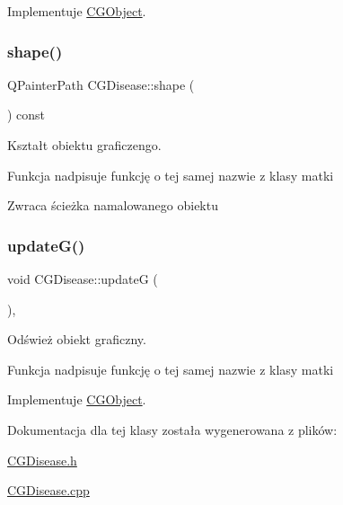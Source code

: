 Implementuje \mbox{\hyperlink{class_c_g_object_a9622c313eb09ca5fc0e34f5d2aaac910}{C\+G\+Object}}.

\mbox{\label{class_c_g_disease_a9cba2dd518ac5625a3982f6f92b3fd3f}} 
\subsubsection{\texorpdfstring{shape()}{shape()}}
{\footnotesize\ttfamily Q\+Painter\+Path C\+G\+Disease\+::shape (\begin{DoxyParamCaption}{ }\end{DoxyParamCaption}) const\hspace{0.3cm}{\ttfamily [override]}}



Kształt obiektu graficzengo. 

Funkcja nadpisuje funkcję o tej samej nazwie z klasy matki \begin{DoxyReturn}{Zwraca}
ścieżka namalowanego obiektu 
\end{DoxyReturn}
\mbox{\label{class_c_g_disease_ab0399cfd8accefe5f049d66efb9539e4}} 
\subsubsection{\texorpdfstring{update\+G()}{updateG()}}
{\footnotesize\ttfamily void C\+G\+Disease\+::updateG (\begin{DoxyParamCaption}{ }\end{DoxyParamCaption})\hspace{0.3cm}{\ttfamily [override]}, {\ttfamily [virtual]}}



Odśwież obiekt graficzny. 

Funkcja nadpisuje funkcję o tej samej nazwie z klasy matki 

Implementuje \mbox{\hyperlink{class_c_g_object_a95e80549666e955edd57ab042c2e8ef5}{C\+G\+Object}}.



Dokumentacja dla tej klasy została wygenerowana z plików\+:\begin{DoxyCompactItemize}
\item 
\mbox{\hyperlink{_c_g_disease_8h}{C\+G\+Disease.\+h}}\item 
\mbox{\hyperlink{_c_g_disease_8cpp}{C\+G\+Disease.\+cpp}}\end{DoxyCompactItemize}
